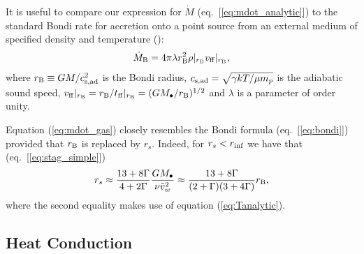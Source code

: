 \documentclass[usenatbib,fleqn]{mn2e}
\newcommand{\rs}{r_s}
\newcommand{\vw}{\tilde{v}_{w}}
\newcommand{\Mbh}[1][]{M_{\bullet#1}}
\newcommand{\tff}{t_{\rm ff}}
\newcommand{\densSlope}{\nu}
\begin{document}

It is useful to compare our expression for $\dot{M}$ (eq.~[\ref{eq:mdot_analytic}]) to the standard Bondi rate for accretion onto a point source from an external medium of specified density and temperature (\citealt{Bondi52}):
\begin{align}
  \dot{M}_{\rm B} =4\pi \lambda r_{\rm B}^2 \rho|_{r_{\rm B}}v_{\rm
    ff}|_{r_{\rm B}},
\label{eq:bondi}
\end{align}
where $r_{\rm B} \equiv GM/c_{\rm s,ad}^{2}$ is the Bondi radius,
$c_{\rm s,ad} = \sqrt{\gamma kT/\mu m_p}$ is the adiabatic sound
speed, $v_{\rm ff}|_{r_{\rm B}} = r_{\rm B}/t_{\rm ff}|_{r_{\rm B}} =
(GM_{\bullet}/r_{\rm B})^{1/2}$ and $\lambda$ is a parameter of order
unity.

Equation (\ref{eq:mdot_gas}) closely resembles the Bondi formula (eq.~[\ref{eq:bondi}]) provided that $r_{\rm B}$ is replaced by $\rs$.  Indeed, for $r_{s} < r_{\rm inf}$ we have that (eq.~[\ref{eq:stag_simple}])
\begin{align}
  \rs\approx\frac{13+8\Gamma}{4+2\Gamma}\frac{G \Mbh}{\densSlope
    \vw^2} \approx \frac{13+8\Gamma}{(2+\Gamma)(3+4\Gamma)}r_{\rm B},
  \label{eq:rbondi}
\end{align}
where the second equality makes use of equation (\ref{eq:Tanalytic}).  

\subsection{Heat Conduction}
\label{sec:conductivity}
\end{document}
